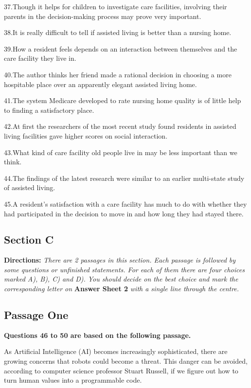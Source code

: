 \documentclass[UTF8,11pt]{ctexart}
\begin{document}
37.Though it helps for children to investigate care facilities, involving their parents in the decision-making process may prove very important.


38.It is really difficult to tell if assisted living is better than a nursing home.


39.How a resident feels depends on an interaction between themselves and the care facility they live in.


40.The author thinks her friend made a rational decision in choosing a more hospitable place over an apparently elegant assisted living home.


41.The system Medicare developed to rate nursing home quality is of little help to finding a satisfactory place.


42.At first the researchers of the most recent study found residents in assisted living facilities gave higher scores on social interaction.


43.What kind of care facility old people live in may be less important than we think.


44.The findings of the latest research were similar to an earlier multi-state study of assisted living.


45.A resident's satisfaction with a care facility has much to do with whether they had participated in the decision to move in and how long they had stayed there.


\subsection*{\textbf{Section C}}


\textbf{Directions:}\textit{ There are 2 passages in this section. Each passage is followed by some questions or unfinished} \textit{statements. For each of them there are four choices marked A), B), C) and D). You should decide on the best choice} \textit{and mark the corresponding letter on}\textbf{ Answer Sheet 2}\textit{ with a single line through the centre.}


\subsection*{\textbf{Passage One}}


\textbf{Questions 46 to 50 are based on the following passage.}


As Artificial Intelligence (AI) becomes increasingly sophisticated, there are growing concerns that robots could become a threat. This danger can be avoided, according to computer science professor Stuart Russell, if we figure out how to turn human values into a programmable code.
\end{document}
